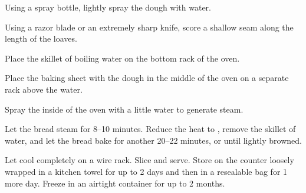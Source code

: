 \begin{method}
    Using a spray bottle, lightly spray the dough with water.\par
    Using a razor blade or an extremely sharp knife, score a shallow seam along the length of the loaves.\par
    Place the skillet of boiling water on the bottom rack of the oven.\par
    Place the baking sheet with the dough in the middle of the oven on a separate rack above the water.\par
    Spray the inside of the oven with a little water to generate steam.\par
    Let the bread steam for 8--10 minutes. Reduce the heat to , remove the skillet of water, and let the bread bake for another 20--22 minutes, or until lightly browned.\par
    Let cool completely on a wire rack. Slice and serve. Store on the counter loosely wrapped in a kitchen towel for up to 2 days and then in a resealable bag for 1 more day. Freeze in an airtight container for up to 2 months.\par
\end{method}
